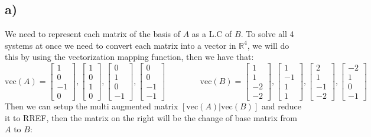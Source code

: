 \documentclass{article}
\begin{document}
\subsection*{a)}
We need to represent each matrix of the basis of $A$ as a L.C of $B$. To solve all 4 systems at once we need to convert each matrix into a vector in $\mathbb{R}^{4}$, we will do this by using the vectorization mapping function, then we have that: 
$$\text{vec}(A)=\begin{bmatrix} 
1\\0\\-1\\0
\end{bmatrix},\begin{bmatrix} 
1\\0\\1\\0
\end{bmatrix},\begin{bmatrix} 
0\\1\\0\\-1
\end{bmatrix},\begin{bmatrix} 
0\\0\\-1\\-1
\end{bmatrix}\;\;\;\;\;\;\;\;\;\;\;\;\;\;\;\text{vec}(B)=\begin{bmatrix} 
1\\1\\-2\\-2
\end{bmatrix},\begin{bmatrix} 
1\\-1\\1\\1
\end{bmatrix},\begin{bmatrix} 
2\\1\\-1\\-2
\end{bmatrix},\begin{bmatrix} 
-2\\1\\0\\-1
\end{bmatrix}$$
Then we can setup the multi augmented matrix $[\text{vec}(A)|\text{vec}(B)]$ and reduce it to RREF, then the matrix on the right will be the change of base matrix from $A$ to $B$:\\
\end{document}
